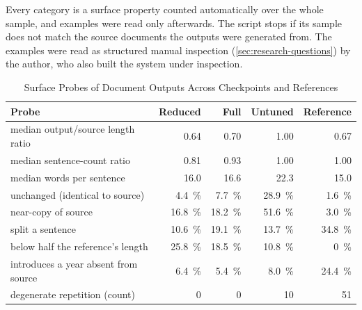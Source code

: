 Every category is a surface property counted automatically over the whole sample, and examples were read only afterwards.
The script stops if its sample does not match the source documents the outputs were generated from.
The examples were read as structured manual inspection (\cref{sec:research-questions}) by the author, who also built the system under inspection.

\begin{table}[htbp]
	\centering
	\footnotesize
	\setlength{\tabcolsep}{3.5pt}
	\caption{Surface Probes of Document Outputs Across Checkpoints and References}
	\label{tab:probes}
	\begin{tabular}{@{}lr|rrr@{}}
		\toprule
		\textbf{Probe}                       & \textbf{Reduced}     & \textbf{Full}        & \textbf{Untuned}     & \textbf{Reference}   \\
		\midrule
		median output/source length ratio    & \num{0.64}           & \num{0.70}           & \num{1.00}           & \num{0.67}           \\
		median sentence-count ratio          & \num{0.81}           & \num{0.93}           & \num{1.00}           & \num{1.00}           \\
		median words per sentence            & \num{16.0}           & \num{16.6}           & \num{22.3}           & \num{15.0}           \\
		unchanged (identical to source)      & \qty{4.4}{\percent}  & \qty{7.7}{\percent}  & \qty{28.9}{\percent} & \qty{1.6}{\percent}  \\
		near-copy of source                  & \qty{16.8}{\percent} & \qty{18.2}{\percent} & \qty{51.6}{\percent} & \qty{3.0}{\percent}  \\
		split a sentence                     & \qty{10.6}{\percent} & \qty{19.1}{\percent} & \qty{13.7}{\percent} & \qty{34.8}{\percent} \\
		below half the reference's length    & \qty{25.8}{\percent} & \qty{18.5}{\percent} & \qty{10.8}{\percent} & \qty{0}{\percent}    \\
		introduces a year absent from source & \qty{6.4}{\percent}  & \qty{5.4}{\percent}  & \qty{8.0}{\percent}  & \qty{24.4}{\percent} \\
		degenerate repetition (count)        & 0                    & 0                    & 10                   & 51                   \\
		\bottomrule
	\end{tabular}
\end{table}

